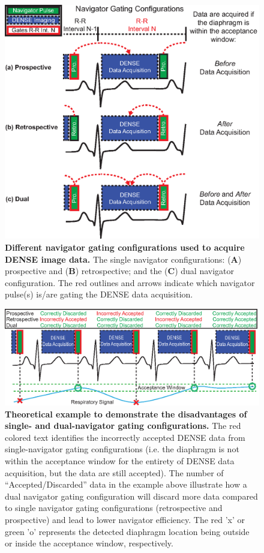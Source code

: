 \begin{figure} 
	\includegraphics{figures/navpaper/Fig1}
	\caption[Different navigator gating configurations used to acquire DENSE image data]{\textbf{Different navigator gating configurations used to acquire DENSE image data.} The single navigator configurations: (\textbf{A}) prospective and (\textbf{B}) retrospective; and the (\textbf{C}) dual navigator configuration. The red outlines and arrows indicate which navigator pulse(s) is/are gating the DENSE data acquisition.}
	\label{fig:navigator_configurations}
\end{figure}

\begin{figure} 
	\includegraphics{figures/navpaper/Fig2}
	\caption[Theoretical example to demonstrate the disadvantages of single- and dual-navigator gating configurations]{\textbf{Theoretical example to demonstrate the disadvantages of single- and dual-navigator gating configurations.} The red colored text identifies the incorrectly accepted DENSE data from single-navigator gating configurations (i.e. the diaphragm is not within the acceptance window for the entirety of DENSE data acquisition, but the data are still accepted). The number of “Accepted/Discarded” data in the example above illustrate how a dual navigator gating configuration will discard more data compared to single navigator gating configurations (retrospective and prospective) and lead to lower navigator efficiency. The red 'x' or green 'o' represents the detected diaphragm location being outside or inside the acceptance window, respectively.}
	\label{fig:navigator_advantages_disadvantages}
\end{figure}

